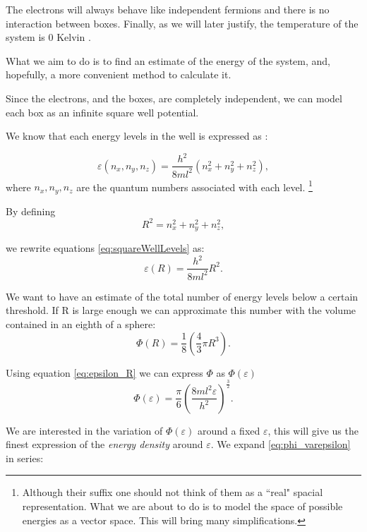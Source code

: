 \documentclass[a4paper,12pt]{article}
\begin{document}
The electrons will always behave like independent fermions and there is no interaction between boxes.
Finally, as we will later justify, the temperature of the system is 0 Kelvin \cite[p.47-51]{Parr}.

What we aim to do is to find an estimate of the energy of the system, and, hopefully, a more convenient method to calculate it.

Since the electrons, and the boxes, are completely independent, we can model each box as an infinite square well potential.

We know that each energy levels in the well is expressed as \cite[p.74]{Basdevant}:

\begin{equation}\label{eq:squareWellLevels}
	\varepsilon(n_{x},n_{y},n_{z}) = \frac{h^2}{8ml^{2}} (n_{x}^2+n_{y}^2+n_{z}^2),
\end{equation}
where $n_{x},n_{y},n_{z}$ are the quantum numbers associated with each level.
\footnote{Although their suffix one should not think of them as a ``real" spacial representation. What we are about to do is to model the space of possible energies as a vector space. This will bring many simplifications.}

By defining 
\begin{equation}
	R^2 = n_{x}^2+n_{y}^2+n_{z}^2,
\end{equation}

we rewrite equations \eqref{eq:squareWellLevels} as:
\begin{equation}\label{eq:epsilon_R}
	\varepsilon(R) = \frac{h^2}{8ml^{2}} R^2.
\end{equation}

We want to have an estimate of the total number of energy levels below a certain threshold. 
If R is large enough we can approximate this number with the volume contained in an eighth of a sphere:
\begin{equation}
	\Phi(R) = \frac{1}{8} \left( \frac{4}{3} \pi R^{3} \right).
\end{equation}

Using equation \eqref{eq:epsilon_R} we can express $\Phi$ as $\Phi(\varepsilon)$ 
\begin{equation}\label{eq:phi_varepsilon}
	\Phi(\varepsilon) = \frac{\pi}{6} \left( \frac{8 m l^2 \varepsilon}{h^2} \right)^{\frac{3}{2	}}.
\end{equation}

We are interested in the variation of $\Phi(\varepsilon)$ around a fixed $\varepsilon$, this will give us the finest expression of the \textit{energy density} around $\varepsilon$. 
We expand \eqref{eq:phi_varepsilon} in series:
\end{document}
